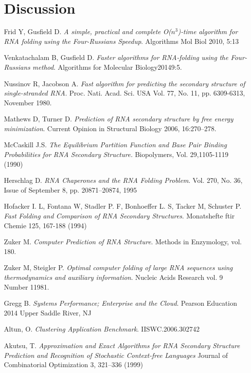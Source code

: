 \documentclass[12pt]{article}
\begin{document}
\section{Discussion}
\begin{thebibliography}{56}
Frid Y, Gusfield D.
\textit{A simple, practical and complete O($n^3$)-time
algorithm for RNA folding using the Four-Russians Speedup}.
Algorithms Mol Biol 2010, 5:13

Venkatachalam B, Gusfield D.
\textit{Faster algorithms for RNA-folding using the Four-Russians method}.
Algorithms for Molecular Biology20149:5.

Nussinov R, Jacobson A.
\textit{Fast algorithm for predicting the secondary structure of
single-stranded RNA}.
Proc. Nati. Acad. Sci. USA Vol. 77, No. 11, pp. 6309-6313, November 1980.

Mathews D, Turner D.
\textit{Prediction of RNA secondary structure by free energy
minimization}.
Current Opinion in Structural Biology 2006, 16:270–278.

McCaskill J.S.
\textit{The Equilibrium Partition Function and Base Pair
Binding Probabilities for RNA Secondary Structure.}
Biopolymers, Vol. 29,1105-1119 (1990)

Herschlag D.
\textit{RNA Chaperones and the RNA Folding Problem}.
Vol. 270, No. 36, Issue of September 8, pp. 20871–20874, 1995

Hofacker I. L, Fontana W, Stadler P. F, Bonhoeffer L. S, Tacker M, Schuster P.
\textit{Fast Folding and Comparison of RNA Secondary Structures}.
Monatshefte ftir Chemie 125, 167-188 (1994)

Zuker M.
\textit{Computer Prediction of RNA Structure}.
Methods in Enzymology, vol. 180.

Zuker M, Steigler P.
\textit{Optimal computer folding of large RNA sequences using thermodynamics and auxiliary information}.
Nucleic Acids Research vol. 9 Number 11981.

Gregg B.
\textit{Systems Performance; Enterprise and the Cloud}.
Pearson Education 2014 Upper Saddle River, NJ

Altun, O.
\textit{Clustering Application Benchmark}.
IISWC.2006.302742

Akutsu, T.
\textit{Approximation and Exact Algorithms for RNA
Secondary Structure Prediction and Recognition
of Stochastic Context-free Languages}
Journal of Combinatorial Optimization 3, 321–336 (1999)


\end{thebibliography}
\end{document}
